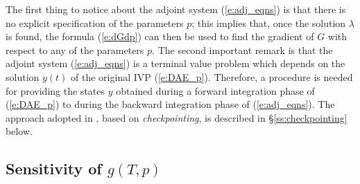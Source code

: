 The first thing to notice about the adjoint system (\ref{e:adj_eqns}) is that there
is no explicit specification of the parameters $p$; this implies that, once the
solution $\lambda$ is found, the formula (\ref{e:dGdp}) can then be used to find
the gradient of $G$ with respect to any of the parameters $p$. 
The second important remark is that the adjoint system (\ref{e:adj_eqns}) is a
terminal value problem which depends on the solution $y(t)$ of the original IVP (\ref{e:DAE_p}).
Therefore, a procedure is needed for providing the states $y$ obtained during a forward
integration phase of (\ref{e:DAE_p}) to {\idas} during the backward integration phase of
(\ref{e:adj_eqns}).  The approach adopted in {\idas}, based on {\em checkpointing},
is described in \S\ref{ss:checkpointing} below.

\subsection{Sensitivity of $g(T,p)$}

